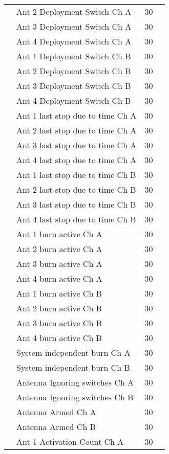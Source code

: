 \begin{longtable}{c|l|c|l}
    & Ant 2 Deployment Switch Ch A & 30 \\
    & Ant 3 Deployment Switch Ch A & 30 \\
    & Ant 4 Deployment Switch Ch A & 30 \\
    \cline{2-4}
    & Ant 1 Deployment Switch Ch B & 30 \\
    & Ant 2 Deployment Switch Ch B & 30 \\
    & Ant 3 Deployment Switch Ch B & 30 \\
    & Ant 4 Deployment Switch Ch B & 30 \\
    \cline{2-4}
    & Ant 1 last stop due to time Ch A & 30 \\
    & Ant 2 last stop due to time Ch A & 30 \\
    & Ant 3 last stop due to time Ch A & 30 \\
    & Ant 4 last stop due to time Ch A & 30 \\
    \cline{2-4}
    & Ant 1 last stop due to time Ch B & 30 \\
    & Ant 2 last stop due to time Ch B & 30 \\
    & Ant 3 last stop due to time Ch B & 30 \\
    & Ant 4 last stop due to time Ch B & 30 \\
    \cline{2-4}
    & Ant 1 burn active Ch A & 30 \\
    & Ant 2 burn active Ch A & 30 \\
    & Ant 3 burn active Ch A & 30 \\
    & Ant 4 burn active Ch A & 30 \\
    \cline{2-4}
    & Ant 1 burn active Ch B & 30 \\
    & Ant 2 burn active Ch B & 30 \\
    & Ant 3 burn active Ch B & 30 \\
    & Ant 4 burn active Ch B & 30 \\ 
    \cline{2-4}
    & System independent burn Ch A & 30 \\
    & System independent burn Ch B & 30 \\
    \cline{2-4}
    & Antenna Ignoring switches Ch A & 30 \\
    & Antenna Ignoring switches Ch B & 30 \\
    \cline{2-4}
    & Antenna Armed Ch A & 30 \\
    & Antenna Armed Ch B & 30 \\
    \cline{2-4}
    & Ant 1 Activation Count Ch A & 30 \\

\end{longtable}
